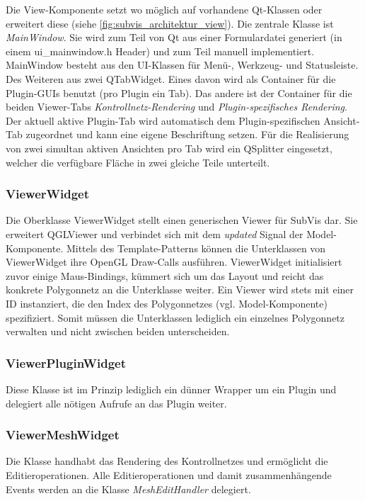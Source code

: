 Die View-Komponente setzt wo möglich auf vorhandene Qt-Klassen oder erweitert diese (siehe \autoref{fig:subvis_architektur_view}).
Die zentrale Klasse ist \emph{MainWindow}. 
Sie wird zum Teil von Qt aus einer Formulardatei generiert (in einem ui\_mainwindow.h Header) und zum Teil manuell implementiert.
MainWindow besteht aus den UI-Klassen für Menü-, Werkzeug- und Statusleiste.
Des Weiteren aus zwei QTabWidget.
Eines davon wird als Container für die Plugin-GUIs benutzt (pro Plugin ein Tab).
Das andere ist der Container für die beiden Viewer-Tabs \emph{Kontrollnetz-Rendering} und \emph{Plugin-spezifisches Rendering}.
Der aktuell aktive Plugin-Tab wird automatisch dem Plugin-spezifischen Ansicht-Tab zugeordnet und kann eine eigene Beschriftung setzen.
Für die Realisierung von zwei simultan aktiven Ansichten pro Tab wird ein QSplitter eingesetzt, welcher die verfügbare Fläche in zwei gleiche Teile unterteilt.

\subsubsection{ViewerWidget}

Die Oberklasse ViewerWidget stellt einen generischen Viewer für SubVis dar.
Sie erweitert QGLViewer und verbindet sich mit dem \emph{updated} Signal der Model-Komponente.
Mittels des Template-Patterns können die Unterklassen von ViewerWidget ihre OpenGL Draw-Calls ausführen.
ViewerWidget initialisiert zuvor einige Maus-Bindings, kümmert sich um das Layout und reicht das konkrete Polygonnetz an die Unterklasse weiter.
Ein Viewer wird stets mit einer ID instanziert, die den Index des Polygonnetzes (vgl. Model-Komponente) spezifiziert.
Somit müssen die Unterklassen lediglich ein einzelnes Polygonnetz verwalten und nicht zwischen beiden unterscheiden.

\subsubsection{ViewerPluginWidget}

Diese Klasse ist im Prinzip lediglich ein dünner Wrapper um ein Plugin und delegiert alle nötigen Aufrufe an das Plugin weiter.

\subsubsection{ViewerMeshWidget}

Die Klasse handhabt das Rendering des Kontrollnetzes und ermöglicht die Editieroperationen.
Alle Editieroperationen und damit zusammenhängende Events werden an die Klasse \emph{MeshEditHandler} delegiert.


